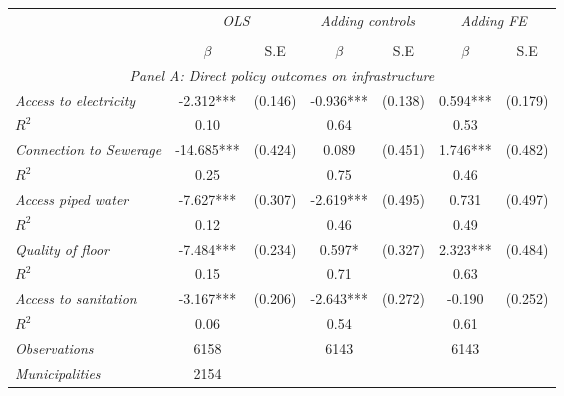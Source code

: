 \begin{tabular}{lcccccc}

\toprule


\multicolumn{1}{l}{} & \multicolumn{2}{c}{\textit{OLS}} & \multicolumn{2}{c}{\textit{Adding controls}} & \multicolumn{2}{c}{\textit{Adding FE}} \\ 
\cmidrule(l{1mm}r{1mm}){2-3} \cmidrule(l{1mm}r{1mm}){4-5} \cmidrule(l{1mm}r{1mm}){6-7}  \\
& $\beta$ & S.E & $\beta$ & S.E & $\beta$ & S.E \\
\hline

\multicolumn{7}{c}{\textit{Panel   A: Direct policy outcomes on infrastructure}}   \\                                                          

\textit{Access to electricity}          &  -2.312***    & (0.146)      &   -0.936***        &  (0.138)      &     0.594***  &    (0.179)   \\
$R^{2}$			           	   &  0.10   & 	   &     0.64   	&		 &     0.53   &  \\

\textit{Connection to Sewerage}          &  -14.685***    & (0.424)      &   0.089        &  (0.451)      &     1.746***  &    (0.482)   \\
$R^{2}$			           	   &  0.25   & 	   &     0.75   	&		 &     0.46   &  \\
		
\textit{Access piped water}          &  -7.627***    & (0.307)      &   -2.619***        &  (0.495)      &     0.731  &    (0.497)   \\
$R^{2}$			           	   &  0.12   & 	   &     0.46   	&		 &     0.49   &  \\

\textit{Quality of floor}          &  -7.484***    & (0.234)      &   0.597*        &  (0.327)      &     2.323***  &    (0.484)   \\
$R^{2}$			           	   &  0.15   & 	   &     0.71   	&		 &     0.63   &  \\

\textit{Access to sanitation}          &  -3.167***    & (0.206)      &   -2.643***        &  (0.272)      &     -0.190  &    (0.252)   \\
$R^{2}$			           	   &  0.06   & 	   &     0.54   	&		 &     0.61   &  \\


\textit{Observations}                 &   6158    &        & 6143    &  &  6143   &  		\\
\textit{Municipalities}               &   2154   &        &    &  &    &  		\\
\hline		
\hline		


\end{tabular}
